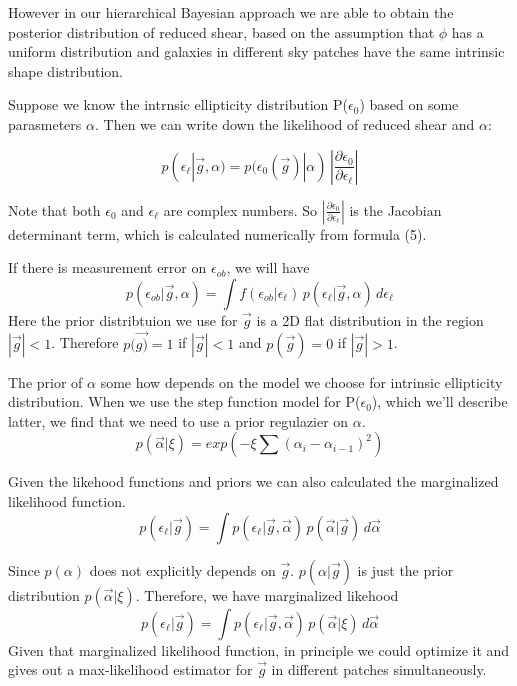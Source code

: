 \documentclass[useAMS,usenatbib]{mn2e}
\begin{document}
However in our hierarchical Bayesian approach we are able to obtain
the posterior distribution of reduced shear, based on the assumption that $\phi$ has
a uniform distribution and galaxies in different sky patches have
the same intrinsic shape distribution.

Suppose we know the intrnsic ellipticity distribution P($\epsilon_{0}$)
based on some parasmeters $\alpha$. Then we can write down the likelihood
of reduced shear and $\alpha$:

\begin{equation}
p(\epsilon_{\ell}|\vec{g},\alpha)=p(\epsilon_{0}(\vec{g})|\alpha)\,|\frac{\partial\epsilon_{0}}{\partial\epsilon_{\ell}}|
\end{equation}



Note that both $\epsilon_{0}$ and $\epsilon_{\ell}$ are complex numbers. So
$|\frac{\partial\epsilon_{0}}{\partial\epsilon_{\ell}}|$ is the Jacobian
determinant term, which is calculated numerically from formula
(5).

If there is measurement error on $\epsilon_{ob}$, we will have 
\begin{equation}
p(\epsilon_{ob}|\vec{g},\alpha)=\int f(\epsilon_{ob}|\epsilon_{\ell})\, p(\epsilon_{\ell}|\vec{g},\alpha)\,d\epsilon_{\ell}
\end{equation}
Here the prior distribtuion we use for $\vec{g}$ is a 2D flat distribution
in the region $|\vec{g}|<1$. Therefore $p(\vec{g)}=1$ if $|\vec{g}|<1$
and $p(\vec{g})=0$ if $|\vec{g}|>1$.

The prior of $\alpha$ some how depends on the model we choose for
intrinsic ellipticity distribution. When we use the step function
model for P($\epsilon_{0}$), which we'll describe latter, we find that
we need to use a prior regulazier on $\alpha$. 
\begin{equation}
p(\vec{\alpha}|\xi)=exp(-\xi\sum(\alpha_{i}-\alpha_{i-1})^{2})
\end{equation}

Given the likehood functions and priors we can also calculated the marginalized likelihood function. 
\begin{equation}
p(\epsilon_{\ell}|\vec{g})=\int p(\epsilon_{\ell}|\vec{g},\vec{\alpha})\,p(\vec{\alpha}|\vec{g})\,d\vec{\alpha}
\end{equation}

Since $p(\alpha)$ does not explicitly depends on $\vec{g}$. $p(\alpha|\vec{g})$ is
just the prior distribution $p(\vec{\alpha}|\xi)$. Therefore, we have
marginalized likehood 
\begin{equation}
p(\epsilon_{\ell}|\vec{g})=\int p(\epsilon_{\ell}|\vec{g},\vec{\alpha})\, p(\vec{\alpha}|\xi)\,d\vec{\alpha}
\end{equation}
Given that marginalized likelihood function, in principle we could optimize it and gives out a max-likelihood estimator for $\vec{g}$
in different patches simultaneously.
\end{document}
